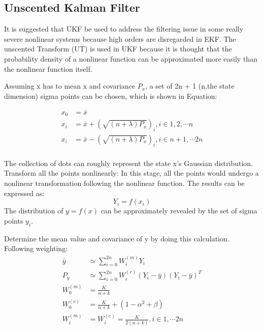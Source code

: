 \subsection{Unscented Kalman Filter}
It is suggested that UKF be used to address the filtering issue in some really severe nonlinear systems because high orders are disregarded in EKF. The unscented Transform (UT) is used in UKF because it is thought that the probability density of a nonlinear function can be approximated more easily than the nonlinear function itself\cite{Comparision_EKF_UKF_He}.

Assuming x has to mean x and covariance $P_x$, a set of 2n + 1 (n,the state dimension) sigma points can be chosen, which is shown in Equation:

\begin{equation} \label{eq:UKF_state_initialization}
    \begin{split}
    x_0 & = \bar{x} \\
    x_i & = \bar{x}  + (\sqrt{(n+\lambda )P_x} )_i, i\in{1,2,\cdots n}\\
    x_i & = \bar{x}  - (\sqrt{(n+\lambda )P_x} )_i, i\in{n+1, \cdots 2n}\\
    \end{split}
\end{equation}

The collection of dots can roughly represent the state x's Gaussian distribution. Transform all the points nonlinearly: In this stage, all the points would undergo a nonlinear transformation following the nonlinear function.
The results can be expressed as:
\begin{equation} \label{eq:UKF_y_results}
    Y_i = f(x_i)
\end{equation}
The distribution of $y = f(x)$  can be approximately revealed by the set of sigma points {$y_i$}\cite{Comparision_EKF_UKF_He}.

Determine the mean value and covariance of y by doing this calculation.
Following weighting:
\begin{equation} \label{eq:UKF_covariance_initialization}
    \begin{split}
    \bar{y} & \simeq  \sum_{i = 0}^{2n} W_i^{(m)} Y_i  \\
    P_y & \simeq  \sum_{i = 0}^{2n} W_i^{(c)} (Y_i  - \bar{y})(Y_i  - \bar{y})^{T}  \\
    W_0^{(m)} &= \frac{K}{n+k}\\
    W_0^{(c)} &= \frac{K}{n+k} + (1 - \alpha^{2} + \beta  )\\
    W_i^{(m)} &= W_i^{(c)} = \frac{K}{2(n+k)}, i\in{1, \cdots 2n} \\
    \end{split}
\end{equation}


